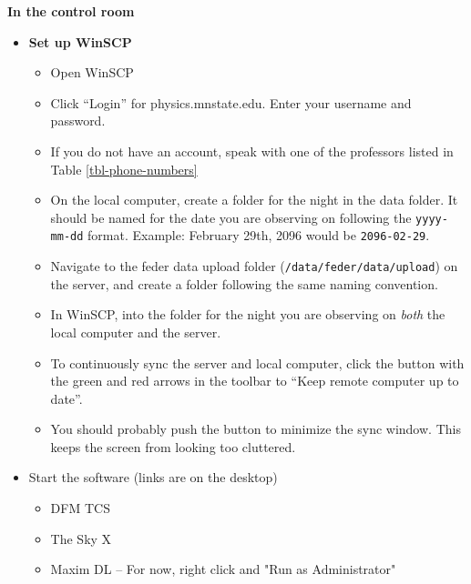 \documentclass[letterpaper, 12pt]{report}
\begin{document}
{\large\textbf{In the control room}}
\begin{itemize}
	\item \textbf{Set up WinSCP}
	\begin{itemize}
		\item Open WinSCP
		\item Click ``Login'' for physics.mnstate.edu. Enter your username and password.
		\item If you do not have an account, speak with one of the professors listed in Table \ref{tbl-phone-numbers}
		\item On the local computer, create a folder for the night in the data folder. It should be named for the date you are observing on following the \texttt{yyyy-mm-dd} format. Example: February 29th, 2096 would be \texttt{2096-02-29}.
		\item Navigate to the feder data upload folder (\texttt{/data/feder/data/upload}) on the server, and create a folder following the same naming convention.
		\item In WinSCP,  into the folder for the night you are observing on \emph{both} the local computer and the server.
		\item To continuously sync the server and local computer, click the button with the green and red arrows in the toolbar to ``Keep remote computer up to date''.
		\item You should probably push the button to minimize the sync window. This keeps the screen from looking too cluttered.
	\end{itemize}
	\item Start the software (links are on the desktop)
	\begin{itemize}
		\item DFM TCS
		\item The Sky X
		\item Maxim DL -- For now, right click and "Run as Administrator"
	\end{itemize}

\end{itemize}
\end{document}
